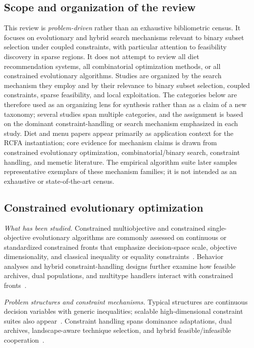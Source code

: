 \documentclass[lettersize,journal]{IEEEtran}
\begin{document}
\subsection{Scope and organization of the review}
This review is \emph{problem-driven} rather than an exhaustive bibliometric census.
It focuses on evolutionary and hybrid search mechanisms relevant to binary subset selection under coupled constraints, with particular attention to feasibility discovery in sparse regions.
It does not attempt to review all diet recommendation systems, all combinatorial optimization methods, or all constrained evolutionary algorithms.
Studies are organized by the search mechanism they employ and by their relevance to binary subset selection, coupled constraints, sparse feasibility, and local exploitation.
The categories below are therefore used as an organizing lens for synthesis rather than as a claim of a new taxonomy; several studies span multiple categories, and the assignment is based on the dominant constraint-handling or search mechanism emphasized in each study.
Diet and menu papers appear primarily as application context for the RCFA instantiation; core evidence for mechanism claims is drawn from constrained evolutionary optimization, combinatorial/binary search, constraint handling, and memetic literature.
The empirical algorithm suite later samples representative exemplars of these mechanism families; it is not intended as an exhaustive or state-of-the-art census.

\subsection{Constrained evolutionary optimization}
\emph{What has been studied.}
Constrained multiobjective and constrained single-objective evolutionary algorithms are commonly assessed on continuous or standardized constrained fronts that emphasize decision-space scale, objective dimensionality, and classical inequality or equality constraints~\cite{deb2002,zhang2007,cheng2016,li2019ctaea,zitzler2001,qiao2024evolutionaryconsfb48,picard2021realisticconstra4721}.
Behavior analyses and hybrid constraint-handling designs further examine how feasible archives, dual populations, and multitype handlers interact with constrained fronts~\cite{yano2022behavioranalysis7a82,yu2024adualpopulationc9fb6,rao2026amultitypeconstrbd9e,kan2017aconstrainedmult6073,cork2025landscapeawarese8d63}.

\emph{Problem structures and constraint mechanisms.}
Typical structures are continuous decision variables with generic inequalities; scalable high-dimensional constraint suites also appear~\cite{qiao2024evolutionaryconsfb48}.
Constraint handling spans dominance adaptations, dual archives, landscape-aware technique selection, and hybrid feasible/infeasible cooperation~\cite{li2019ctaea,li2022aconstrainedmultef18,cork2025landscapeawarese8d63,kan2017aconstrainedmult6073}.
\end{document}
